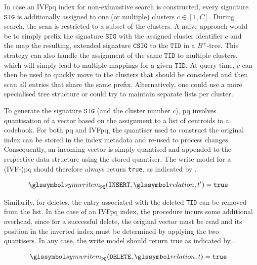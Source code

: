 In case an IVF\acrshort{pq} index for non-exhaustive search is constructed, every signature $\mathtt{SIG}$ is additionally assigned to one (or multiple) clusters $c \in [1, C]$. During search, the scan is restricted to a subset of the clusters. A naive approach would be to simply prefix the signature $\mathtt{SIG}$ with the assigned cluster identifier $c$ and the map the resulting, extended signature $\mathtt{CSIG}$ to the $\mathtt{TID}$ in a $B^{+}$-tree. This strategy can also handle the assignment of the same $\mathtt{TID}$ to multiple clusters, which will simply lead to multiple mappings for a given $\mathtt{TID}$. At query time, $c$ can then be used to quickly move to the clusters that should be considered and then scan all entries that share the same prefix. Alternatively, one could use a more specialised tree structure or could try to maintain separate lists per cluster.

To generate the signature $\mathtt{SIG}$ (and the cluster number $c$), \acrshort{pq} involves quantisation of a vector based on the assignment to a list of centroids in a codebook. For both \acrshort{pq} and IVF\acrshort{pq}, the quantiser used to construct the original index can be stored in the index metadata and re-used to process changes. Consequently, an incoming vector is simply quantised and appended to the respective data structure using the stored quantiser. The write model for a (IVF-)\acrshort{pq} should therefore always return \texttt{true}, as indicated by .

\begin{equation}
    \label{equation:write_model_insert_pq}
    \symwritem_{\mathtt{PQ}}(\mathtt{INSERT}, \relation, t^{\prime}) = \mathtt{true}
\end{equation}

Similarily, for deletes, the entry associated with the deleted \texttt{TID} can be removed from the list. In the case of an IVF\acrshort{pq} index, the procedure incurs some additional overhead, since for a successful delete, the original vector must be read and its position in the inverted index must be determined by applying the two quantisers. In any case, the write model should return true as indicated by .

\begin{equation}
    \label{equation:write_model_delete_pq}
    \symwritem_{\mathtt{PQ}}(\mathtt{DELETE}, \relation, t) = \mathtt{true}
\end{equation}

